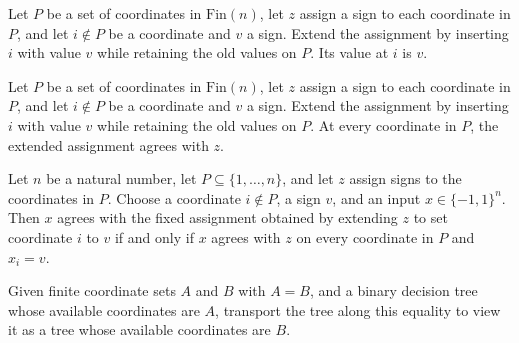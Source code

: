 \begin{theorem}
\label{FABL.insertJuntaFixedAssignment_apply_new}
\leanok
{}
Let $P$ be a set of coordinates in $\mathrm{Fin}(n)$, let $z$ assign a sign to each
coordinate in $P$, and let $i\notin P$ be a coordinate and $v$ a sign. Extend the
assignment by inserting $i$ with value $v$ while retaining the old values on $P$. Its
value at $i$ is $v$.
\end{theorem}

\begin{theorem}
\label{FABL.insertJuntaFixedAssignment_apply_old}
\leanok
{}
Let $P$ be a set of coordinates in $\mathrm{Fin}(n)$, let $z$ assign a sign to each
coordinate in $P$, and let $i\notin P$ be a coordinate and $v$ a sign. Extend the
assignment by inserting $i$ with value $v$ while retaining the old values on $P$. At
every coordinate in $P$, the extended assignment agrees with $z$.
\end{theorem}

\begin{theorem}
\label{FABL.matches_insertJuntaFixedAssignment_iff}
\leanok
{}
Let $n$ be a natural number, let $P\subseteq\{1,\ldots,n\}$, and let $z$ assign
signs to the coordinates in $P$. Choose a coordinate $i\notin P$, a sign $v$, and an
input $x\in\{-1,1\}^n$. Then $x$ agrees with the fixed assignment obtained by
extending $z$ to set coordinate $i$ to $v$ if and only if $x$ agrees with $z$ on every
coordinate in $P$ and $x_i=v$.
\end{theorem}

\begin{definition}
\leanok
{}
Given finite coordinate sets $A$ and $B$ with $A=B$, and a binary decision tree whose
available coordinates are $A$, transport the tree along this equality to view it as a
tree whose available coordinates are $B$.
\end{definition}

